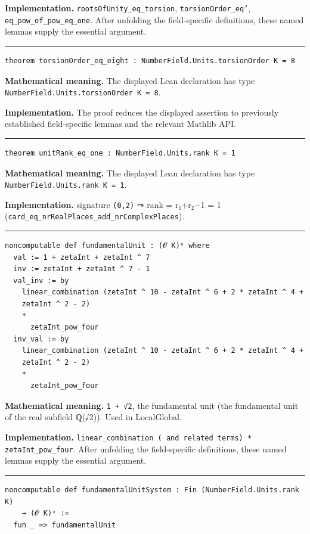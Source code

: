 \documentclass[UTF8,a4paper,11pt,fontset=fandol]{ctexart}
\theoremstyle{definition}
\newcommand{\statementsep}{\par\medskip\hrule\medskip}
\begin{document}
\noindent\textbf{Implementation.} \texttt{rootsOfUnity\_\allowbreak{}eq\_\allowbreak{}torsion}, \texttt{torsionOrder\_\allowbreak{}eq'}, \texttt{eq\_\allowbreak{}pow\_\allowbreak{}of\_\allowbreak{}pow\_\allowbreak{}eq\_\allowbreak{}one}. After unfolding the field-specific definitions, these named lemmas supply the essential argument.\par
\statementsep
\begin{verbatim}
theorem torsionOrder_eq_eight : NumberField.Units.torsionOrder K = 8
\end{verbatim}
\noindent\textbf{Mathematical meaning.} The displayed Lean declaration has type \texttt{NumberField.\allowbreak{}Units.\allowbreak{}torsionOrder K = 8}.\par
\noindent\textbf{Implementation.} The proof reduces the displayed assertion to previously established field-specific lemmas and the relevant Mathlib API.\par
\statementsep
\begin{verbatim}
theorem unitRank_eq_one : NumberField.Units.rank K = 1
\end{verbatim}
\noindent\textbf{Mathematical meaning.} The displayed Lean declaration has type \texttt{NumberField.\allowbreak{}Units.\allowbreak{}rank K = 1}.\par
\noindent\textbf{Implementation.} signature \texttt{(0,2)} ⇒ rank = r₁+r₂−1 = 1 (\texttt{card\_\allowbreak{}eq\_\allowbreak{}nrRealPlaces\_\allowbreak{}add\_\allowbreak{}nrComplexPlaces}).\par
\statementsep
\begin{verbatim}
noncomputable def fundamentalUnit : (𝓞 K)ˣ where
  val := 1 + zetaInt + zetaInt ^ 7
  inv := zetaInt + zetaInt ^ 7 - 1
  val_inv := by
    linear_combination (zetaInt ^ 10 - zetaInt ^ 6 + 2 * zetaInt ^ 4 +
    zetaInt ^ 2 - 2)
    *
      zetaInt_pow_four
  inv_val := by
    linear_combination (zetaInt ^ 10 - zetaInt ^ 6 + 2 * zetaInt ^ 4 +
    zetaInt ^ 2 - 2)
    *
      zetaInt_pow_four
\end{verbatim}
\noindent\textbf{Mathematical meaning.} \texttt{1 + √2}, the fundamental unit (the fundamental unit of the real subfield ℚ(√2)). Used in LocalGlobal.\par
\noindent\textbf{Implementation.} \texttt{linear\_\allowbreak{}combination ( and related terms) * zetaInt\_\allowbreak{}pow\_\allowbreak{}four}. After unfolding the field-specific definitions, these named lemmas supply the essential argument.\par
\statementsep
\begin{verbatim}
noncomputable def fundamentalUnitSystem : Fin (NumberField.Units.rank K)
    → (𝓞 K)ˣ :=
  fun _ => fundamentalUnit
\end{verbatim}
\end{document}
